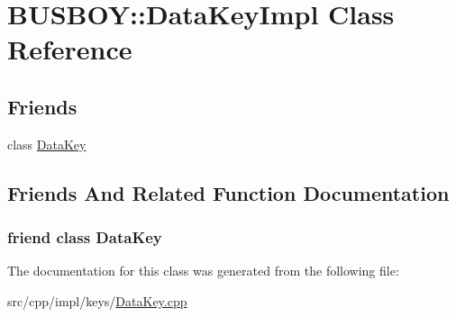 \hypertarget{classBUSBOY_1_1DataKeyImpl}{
\section{BUSBOY::DataKeyImpl Class Reference}
\label{classBUSBOY_1_1DataKeyImpl}
}
\subsection*{Friends}
\begin{DoxyCompactItemize}
\item 
class \hyperlink{classBUSBOY_1_1DataKeyImpl_a3d65410722ee28031dd8353fcafa4940}{DataKey}
\end{DoxyCompactItemize}


\subsection{Friends And Related Function Documentation}
\hypertarget{classBUSBOY_1_1DataKeyImpl_a3d65410722ee28031dd8353fcafa4940}{
\subsubsection[{DataKey}]{\setlength{\rightskip}{0pt plus 5cm}friend class {\bf DataKey}}}
\label{classBUSBOY_1_1DataKeyImpl_a3d65410722ee28031dd8353fcafa4940}


The documentation for this class was generated from the following file:\begin{DoxyCompactItemize}
\item 
src/cpp/impl/keys/\hyperlink{DataKey_8cpp}{DataKey.cpp}\end{DoxyCompactItemize}
